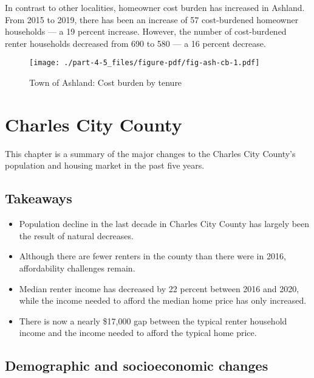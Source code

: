 \documentclass[
  letterpaper,
  DIV=11,
  numbers=noendperiod]{scrreprt}
\providecommand{\tightlist}{%
  \setlength{\itemsep}{0pt}\setlength{\parskip}{0pt}}\usepackage{longtable,booktabs,array}
\begin{document}
In contrast to other localities, homeowner cost burden has increased in
Ashland. From 2015 to 2019, there has been an increase of 57
cost-burdened homeowner households --- a 19 percent increase. However,
the number of cost-burdened renter households decreased from 690 to 580
--- a 16 percent decrease.

\begin{figure}

{\centering \texttt{[image: ./part-4-5\_files/figure-pdf/fig-ash-cb-1.pdf]}

}

\caption{\label{fig-ash-cb}Town of Ashland: Cost burden by tenure}

\end{figure}

\hypertarget{part-4-6}{%
\chapter{Charles City County}\label{part-4-6}}

This chapter is a summary of the major changes to the Charles City
County's population and housing market in the past five years.

\hypertarget{takeaways-5}{%
\section{Takeaways}\label{takeaways-5}}

\begin{itemize}
\tightlist
\item
  Population decline in the last decade in Charles City County has
  largely been the result of natural decreases.
\item
  Although there are fewer renters in the county than there were in
  2016, affordability challenges remain.
\item
  Median renter income has decreased by 22 percent between 2016 and
  2020, while the income needed to afford the median home price has only
  increased.
\item
  There is now a nearly \$17,000 gap between the typical renter
  household income and the income needed to afford the typical home
  price.
\end{itemize}

\hypertarget{demographic-and-socioeconomic-changes-5}{%
\section{Demographic and socioeconomic
changes}\label{demographic-and-socioeconomic-changes-5}}
\end{document}
